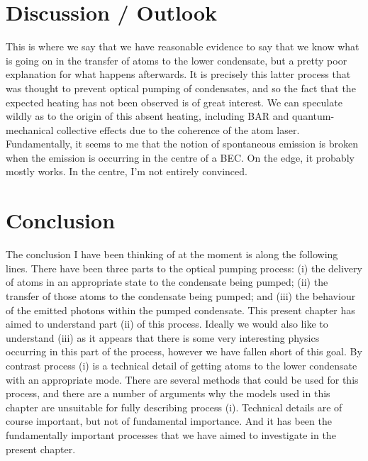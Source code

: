 \section{Discussion / Outlook}
\label{OpticalPumping:Discussion}

This is where we say that we have reasonable evidence to say that we know what is going on in the transfer of atoms to the lower condensate, but a pretty poor explanation for what happens afterwards.  It is precisely this latter process that was thought to prevent optical pumping of condensates, and so the fact that the expected heating has not been observed is of great interest.  We can speculate wildly as to the origin of this absent heating, including BAR and quantum-mechanical collective effects due to the coherence of the atom laser.  Fundamentally, it seems to me that the notion of spontaneous emission is broken when the emission is occurring in the centre of a BEC.  On the edge, it probably mostly works.  In the centre, I'm not entirely convinced.

\section{Conclusion}

The conclusion I have been thinking of at the moment is along the following lines.  There have been three parts to the optical pumping process: (i) the delivery of atoms in an appropriate state to the condensate being pumped; (ii) the transfer of those atoms to the condensate being pumped; and (iii) the behaviour of the emitted photons within the pumped condensate.  This present chapter has aimed to understand part (ii) of this process.  Ideally we would also like to understand (iii) as it appears that there is some very interesting physics occurring in this part of the process, however we have fallen short of this goal.  By contrast process (i) is a technical detail of getting atoms to the lower condensate with an appropriate mode.  There are several methods that could be used for this process, and there are a number of arguments why the models used in this chapter are unsuitable for fully describing process (i).  Technical details are of course important, but not of fundamental importance.  And it has been the fundamentally important processes that we have aimed to investigate in the present chapter.
